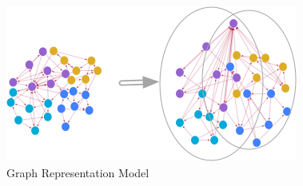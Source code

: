 \FloatBarrier

\begin{figure}[!htbp]
  \centering
  \includegraphics[width=\linewidth,height=\textheight,keepaspectratio]{images/graph_normalization}
  \caption{Graph Representation Model}
  \label{graph_model}
\end{figure}